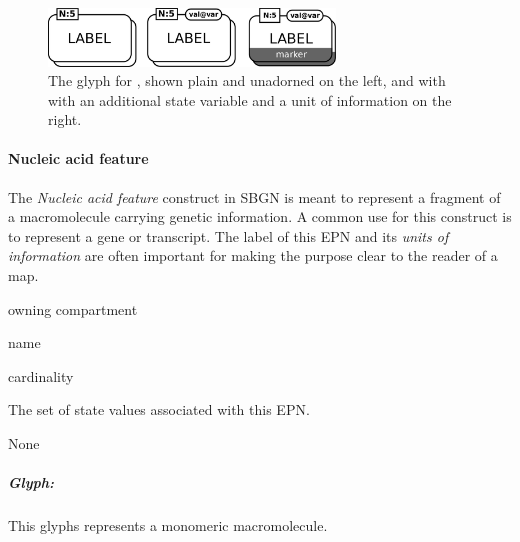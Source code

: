 \begin{figure}[H]
  \centering
  \includegraphics[width = 3.0in]{images/macromolMultimer}
  \caption{The \PD glyph for , shown plain and
    unadorned on the left, and with with an additional state variable and a
    unit of information on the right.}
  \label{fig:macromolMultimer}
\end{figure}


\paragraph{Nucleic acid feature}
\label{sec:genetic}

The \emph{Nucleic acid feature} construct in SBGN is meant to represent a fragment of a macromolecule carrying genetic information.  A common use for this construct is to represent a gene or transcript.  The label of this EPN and its \emph{units of information} are often important for making the purpose clear to the reader of a map.

\begin{glyphDescription}
 \begin{glyphIdentity}
  \item owning compartment
  \item name
  \item cardinality
  \item The set of state values associated with this EPN.
  \end{glyphIdentity}
  \glyphRules None
\end{glyphDescription}

\subparagraph{Glyph: }

This glyphs represents a monomeric macromolecule.

